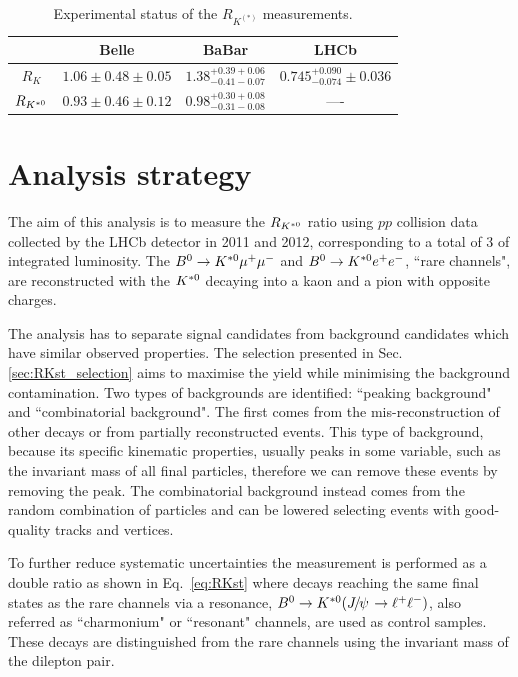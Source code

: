 \begin{center}
\begin{table}[h!]
\centering
\caption{Experimental status of the $R_{K^{(*)}}$ measurements. } %
\begin{tabular}{c|c|c|c}
 	& Belle 			& BaBar 		& LHCb \\
 \hline
$R_K$			& $1.06 \pm 0.48 \pm 0.05$	& $1.38^{+0.39+0.06}_{-0.41-0.07}$ & $0.745^{+0.090}_{-0.074} \pm 0.036$\\
$R_{{{K}^{*0}}}$	& $0.93 \pm 0.46 \pm 0.12$	& $0.98^{+0.30+0.08}_{-0.31-0.08}$ & ----\\
\end{tabular}
\label{tab:expstatus}
\end{table}
\end{center}


\section{Analysis strategy}

The aim of this analysis is to measure the $R_{{{K}^{*0}}}$ ratio using $pp$ collision data collected by the LHCb
detector in 2011 and 2012, corresponding to a total of 3 \invfb of integrated luminosity.
The ${{B}^0} \rightarrow {\ensuremath{{K}^{*0}}}{\ensuremath{\mu^+\mu^-}}$ and ${{B}^0} \rightarrow {\ensuremath{{K}^{*0}}}{\ensuremath{e^+e^-}}$, ``rare channels", are
reconstructed with the ${{K}^{*0}}$ decaying into a kaon and a pion with opposite charges.

The analysis has to separate signal candidates from background candidates which have similar observed properties. 
The selection presented in Sec. \ref{sec:RKst_selection} aims to maximise the yield while minimising
the background contamination. Two types of backgrounds are identified: ``peaking background" and ``combinatorial background". 
The first comes from the mis-reconstruction of other decays or from partially reconstructed events. This type 
of background,  because its specific kinematic properties, usually peaks in some variable, such as the invariant
mass of all final particles, therefore we can remove these events by removing the peak. 
The combinatorial background  instead comes from the random combination of particles and can 
be lowered selecting events with good-quality tracks and vertices.

To further reduce systematic uncertainties the measurement is performed as a double ratio as shown in
Eq.~\ref{eq:RKst} %
where decays reaching the same final states as the rare channels via a \jpsi resonance, $\Bz\to\Kstarz(\jpsi\to\ll)$,
also referred as ``charmonium" or ``resonant" channels, are used as control samples.
These decays are distinguished from the rare channels using the invariant mass of the dilepton pair.

